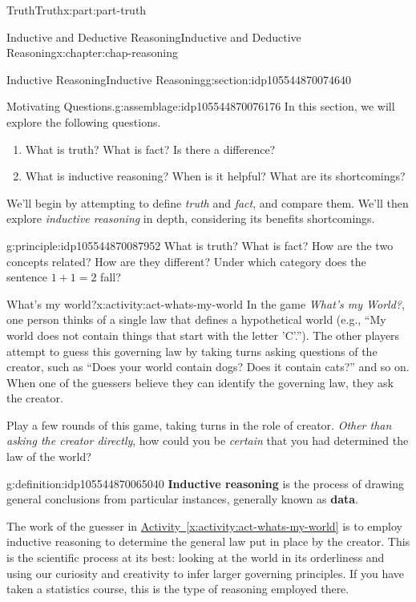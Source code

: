 \documentclass[oneside,10pt,]{book}
\newcommand{\xreffont}{\relax}
\newcommand{\terminology}[1]{\textbf{#1}}
\numberwithin{equation}{section}
\begin{document}
\begin{partptx}{Truth}{}{Truth}{}{}{x:part:part-truth}
\begin{chapterptx}{Inductive and Deductive Reasoning}{}{Inductive and Deductive Reasoning}{}{}{x:chapter:chap-reasoning}
\begin{sectionptx}{Inductive Reasoning}{}{Inductive Reasoning}{}{}{g:section:idp105544870074640}
\begin{assemblage}{Motivating Questions.}{g:assemblage:idp105544870076176}%
In this section, we will explore the following questions. %
\begin{enumerate}
\item{}What is truth? What is fact? Is there a difference?%
\item{}What is inductive reasoning? When is it helpful? What are its shortcomings?%
\end{enumerate}
%
\end{assemblage}
We'll begin by attempting to define \emph{truth} and \emph{fact}, and compare them. We'll then explore \emph{inductive reasoning} in depth, considering its benefits shortcomings.%
\begin{principle}{}{}{g:principle:idp105544870087952}%
What is truth? What is fact? How are the two concepts related? How are they different? Under which category does the sentence \(1+1=2\) fall?%
\end{principle}
\begin{activity}{What's my world?}{x:activity:act-whats-my-world}%
In the game \emph{What's my World?}, one person thinks of a single law that defines a hypothetical world (e.g., ``My world does not contain things that start with the letter 'C'.''). The other players attempt to guess this governing law by taking turns asking questions of the creator, such as ``Does your world contain dogs? Does it contain cats?'' and so on. When one of the guessers believe they can identify the governing law, they ask the creator.%
\par
Play a few rounds of this game, taking turns in the role of creator. \emph{Other than asking the creator directly}, how could you be \emph{certain} that you had determined the law of the world?%
\end{activity}%
\begin{definition}{}{g:definition:idp105544870065040}%
%
\terminology{Inductive reasoning} is the process of drawing general conclusions from particular instances, generally known as \terminology{data}.%
\end{definition}
The work of the guesser in \hyperref[x:activity:act-whats-my-world]{Activity~{\xreffont\ref{x:activity:act-whats-my-world}}} is to employ inductive reasoning to determine the general law put in place by the creator. This is the scientific process at its best: looking at the world in its orderliness and using our curiosity and creativity to infer larger governing principles. If you have taken a statistics course, this is the type of reasoning employed there.%

\end{sectionptx}
\end{chapterptx}
\end{partptx}
\end{document}
